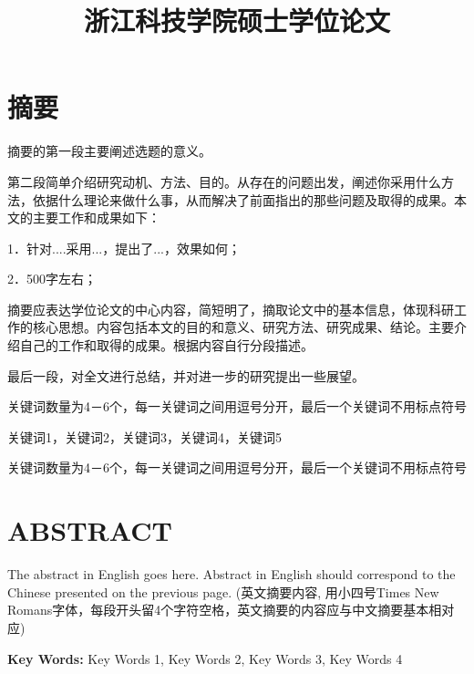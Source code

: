 \documentclass{ZUST_Thesis}
\title{浙江科技学院硕士学位论文}
\begin{document}
	
\maketitle

\pagestyle{abstractch}
\section*{摘\qquad 要}

摘要的第一段主要阐述选题的意义。

第二段简单介绍研究动机、方法、目的。从存在的问题出发，阐述你采用什么方法，依据什么理论来做什么事，从而解决了前面指出的那些问题及取得的成果。本文的主要工作和成果如下：

1．针对....采用...，提出了...，效果如何；

2．500字左右；

摘要应表达学位论文的中心内容，简短明了，摘取论文中的基本信息，体现科研工作的核心思想。内容包括本文的目的和意义、研究方法、研究成果、结论。主要介绍自己的工作和取得的成果。根据内容自行分段描述。

最后一段，对全文进行总结，并对进一步的研究提出一些展望。

关键词数量为4－6个，每一关键词之间用逗号分开，最后一个关键词不用标点符号

\songti 关键词1，关键词2，关键词3，关键词4，关键词5

关键词数量为4－6个，每一关键词之间用逗号分开，最后一个关键词不用标点符号



\newpage
\pagestyle{abstracten}
\section*{ABSTRACT}

The abstract in English goes here. Abstract in English should correspond to the  Chinese presented on the previous page. (英文摘要内容, 用小四号Times New Romans字体，每段开头留4个字符空格，英文摘要的内容应与中文摘要基本相对应)

\textbf{Key Words:} Key Words 1, Key Words 2, Key Words 3, Key Words 4
\end{document}
